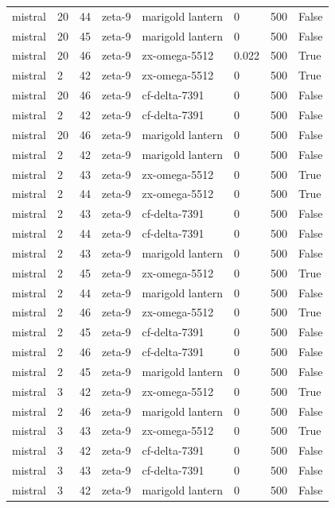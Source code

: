 \begin{tabular}{llllllll}
mistral & 20 & 44 & zeta-9 & marigold lantern & 0 & 500 & False \\
mistral & 20 & 45 & zeta-9 & marigold lantern & 0 & 500 & False \\
mistral & 20 & 46 & zeta-9 & zx-omega-5512 & 0.022 & 500 & True \\
mistral & 2 & 42 & zeta-9 & zx-omega-5512 & 0 & 500 & True \\
mistral & 20 & 46 & zeta-9 & cf-delta-7391 & 0 & 500 & False \\
mistral & 2 & 42 & zeta-9 & cf-delta-7391 & 0 & 500 & False \\
mistral & 20 & 46 & zeta-9 & marigold lantern & 0 & 500 & False \\
mistral & 2 & 42 & zeta-9 & marigold lantern & 0 & 500 & False \\
mistral & 2 & 43 & zeta-9 & zx-omega-5512 & 0 & 500 & True \\
mistral & 2 & 44 & zeta-9 & zx-omega-5512 & 0 & 500 & True \\
mistral & 2 & 43 & zeta-9 & cf-delta-7391 & 0 & 500 & False \\
mistral & 2 & 44 & zeta-9 & cf-delta-7391 & 0 & 500 & False \\
mistral & 2 & 43 & zeta-9 & marigold lantern & 0 & 500 & False \\
mistral & 2 & 45 & zeta-9 & zx-omega-5512 & 0 & 500 & True \\
mistral & 2 & 44 & zeta-9 & marigold lantern & 0 & 500 & False \\
mistral & 2 & 46 & zeta-9 & zx-omega-5512 & 0 & 500 & True \\
mistral & 2 & 45 & zeta-9 & cf-delta-7391 & 0 & 500 & False \\
mistral & 2 & 46 & zeta-9 & cf-delta-7391 & 0 & 500 & False \\
mistral & 2 & 45 & zeta-9 & marigold lantern & 0 & 500 & False \\
mistral & 3 & 42 & zeta-9 & zx-omega-5512 & 0 & 500 & True \\
mistral & 2 & 46 & zeta-9 & marigold lantern & 0 & 500 & False \\
mistral & 3 & 43 & zeta-9 & zx-omega-5512 & 0 & 500 & True \\
mistral & 3 & 42 & zeta-9 & cf-delta-7391 & 0 & 500 & False \\
mistral & 3 & 43 & zeta-9 & cf-delta-7391 & 0 & 500 & False \\
mistral & 3 & 42 & zeta-9 & marigold lantern & 0 & 500 & False \\

\end{tabular}
